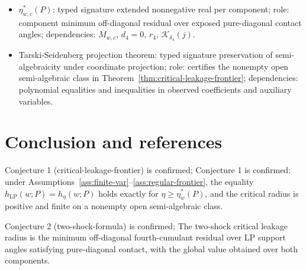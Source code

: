 \documentclass[11pt]{article}
\theoremstyle{definition}
\theoremstyle{plain}
\theoremstyle{remark}
\begin{document}
\begin{itemize}[leftmargin=*]
  \item \(\eta_{w,c}^*(P)\): typed signature extended nonnegative real per component; role: component minimum off-diagonal residual over exposed pure-diagonal contact angles; dependencies: \(M_{w,c}\), \(d_4=0\), \(r_4\), \(\mathcal K_{\delta_4}(j)\).
  \item Tarski-Seidenberg projection theorem: typed signature preservation of semi-algebraicity under coordinate projection; role: certifies the nonempty open semi-algebraic class in Theorem~\ref{thm:critical-leakage-frontier}; dependencies: polynomial equalities and inequalities in observed coefficients and auxiliary variables.
\end{itemize}

\section{Conclusion and references}
Conjecture 1 (critical-leakage-frontier) is confirmed; Conjecture 1 is confirmed: under Assumptions~\ref{ass:finite-var}--\ref{ass:regular-frontier}, the equality \(h_{\mathrm{LP}}(w;P)=h_\eta(w;P)\) holds exactly for \(\eta\ge\eta_w^*(P)\), and the critical radius is positive and finite on a nonempty open semi-algebraic class.

Conjecture 2 (two-shock-formula) is confirmed; The two-shock critical leakage radius is the minimum off-diagonal fourth-cumulant residual over LP support angles satisfying pure-diagonal contact, with the global value obtained over both components.
\end{document}
